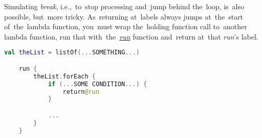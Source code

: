 \note Simulating \textit{break}, i.e.,~to~stop processing and~jump behind the~loop, is~also possible, but~more tricky.
As~returning at~labels always jumps at~the~start of~the~lambda function, you~must wrap the~holding function call to~another lambda function, run that with~the~\hyperref[kotlinrun]{\textit{run}} function and~return at~that \textit{run}'s label.
\newpage

\begin{lstlisting}[language=Kotlin]
    val theList = listOf(...SOMETHING...)

    run {
        theList.forEach {
            if (...SOME CONDITION...) {
                return@run
            }

            ...
        }
    }
\end{lstlisting}
